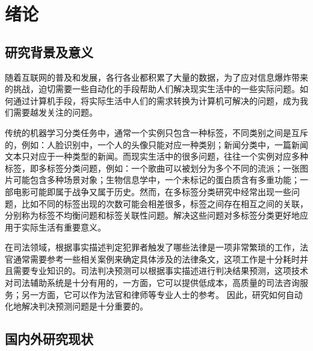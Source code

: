 
\chapter{绪论}
\section{研究背景及意义}
随着互联网的普及和发展，各行各业都积累了大量的数据，为了应对信息爆炸带来的挑战，迫切需要一些自动化的手段帮助人们解决现实生活中的一些实际问题。如何通过计算机手段，将实际生活中人们的需求转换为计算机可解决的问题，成为我们需要越发关注的问题。

传统的机器学习分类任务中，通常一个实例只包含一种标签，不同类别之间是互斥的，例如：人脸识别中，一个人的头像只能对应一种类别；新闻分类中，一篇新闻文本只对应于一种类型的新闻。而现实生活中的很多问题，往往一个实例对应多种标签，即多标签分类问题，例如：一个歌曲可以被划分为多个不同的流派；一张图片可能包含多种场景对象；生物信息学中，一个未标记的蛋白质含有多重功能；一部电影可能即属于战争又属于历史。然而，在多标签分类研究中经常出现一些问题，比如不同的标签出现的次数可能会相差很多，标签之间存在相互之间的关联，分别称为标签不均衡问题和标签关联性问题。解决这些问题对多标签分类更好地应用于实际生活有重要意义。

在司法领域，根据事实描述判定犯罪者触发了哪些法律是一项非常繁琐的工作，法官通常需要参考一些相关案例来确定具体涉及的法律条文，这项工作是十分耗时并且需要专业知识的。司法判决预测可以根据事实描述进行判决结果预测，这项技术对司法辅助系统是十分有用的，一方面，它可以提供低成本，高质量的司法咨询服务；另一方面，它可以作为法官和律师等专业人士的参考。 因此，研究如何自动化地解决判决预测问题是十分重要的。




\section{国内外研究现状}
